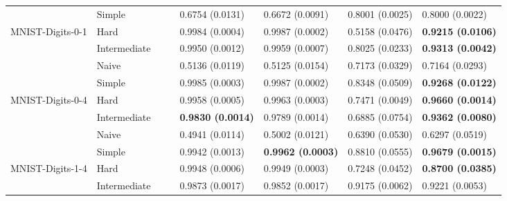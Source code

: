 \begin{tabular}{llllllll}
                 & Simple &                           &                           &           0.6754 (0.0131) &           0.6672 (0.0091) &           0.8001 (0.0025) &           0.8000 (0.0022) \\
MNIST-Digits-0-1 & Hard &                           &                           &           0.9984 (0.0004) &           0.9987 (0.0002) &           0.5158 (0.0476) &  \textbf{0.9215 (0.0106)} \\
                 & Intermediate &                           &                           &           0.9950 (0.0012) &           0.9959 (0.0007) &           0.8025 (0.0233) &  \textbf{0.9313 (0.0042)} \\
                 & Naive &                           &                           &           0.5136 (0.0119) &           0.5125 (0.0154) &           0.7173 (0.0329) &           0.7164 (0.0293) \\
                 & Simple &                           &                           &           0.9985 (0.0003) &           0.9987 (0.0002) &           0.8348 (0.0509) &  \textbf{0.9268 (0.0122)} \\
MNIST-Digits-0-4 & Hard &                           &                           &           0.9958 (0.0005) &           0.9963 (0.0003) &           0.7471 (0.0049) &  \textbf{0.9660 (0.0014)} \\
                 & Intermediate &                           &                           &  \textbf{0.9830 (0.0014)} &           0.9789 (0.0014) &           0.6885 (0.0754) &  \textbf{0.9362 (0.0080)} \\
                 & Naive &                           &                           &           0.4941 (0.0114) &           0.5002 (0.0121) &           0.6390 (0.0530) &           0.6297 (0.0519) \\
                 & Simple &                           &                           &           0.9942 (0.0013) &  \textbf{0.9962 (0.0003)} &           0.8810 (0.0555) &  \textbf{0.9679 (0.0015)} \\
MNIST-Digits-1-4 & Hard &                           &                           &           0.9948 (0.0006) &           0.9949 (0.0003) &           0.7248 (0.0452) &  \textbf{0.8700 (0.0385)} \\
                 & Intermediate &                           &                           &           0.9873 (0.0017) &           0.9852 (0.0017) &           0.9175 (0.0062) &           0.9221 (0.0053) \\

\end{tabular}
